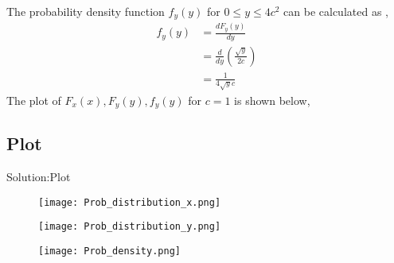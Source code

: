 \documentclass{beamer}
\providecommand{\brak}[1]{\ensuremath{\left(#1\right)}}
\begin{document}
\begin{frame}
             The probability density function $f_{y}\brak{y}$ for $ 0 \leq y \leq 4c^2 $ can be calculated as ,
                     \begin{align}
                                  f_{y}\brak{y} &= \frac{dF_{y}\brak{y}}{dy}\\
                                                       &= \frac{d}{dy}\brak{\frac{\sqrt{y}}{2c}} \\
                                                       & = \frac{1}{4\sqrt{y}c}
                      \end{align}
The plot of $ F_{x}\brak{x} ,F_{y}\brak{y},f_{y}\brak{y}$ for $c=1$ is shown below,
\end{frame}
\subsection{Plot}
\begin{frame}{Solution:Plot}
\begin{figure}
    \centering
    \texttt{[image: Prob\_distribution\_x.png]}
    \caption{ }
    \label{Figure 1}
   \end{figure}
\end{frame}

\begin{frame}
\begin{figure}
    \centering
    \texttt{[image: Prob\_distribution\_y.png]}
    \caption{}
    \label{Figure 2}
\end{figure}
\end{frame}
\begin{frame}

  \begin{figure}
   \centering
    \texttt{[image: Prob\_density.png]}
   \caption{}
  \label{Figure 3}
  \end{figure}

\end{frame}
\end{document}
